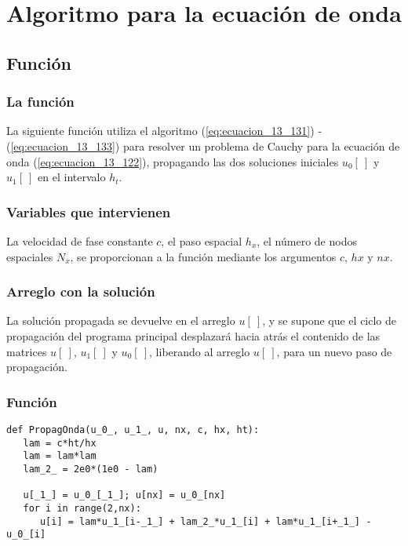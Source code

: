\section{Algoritmo para la ecuación de onda}
\subsection{Función \protect{}}
\begin{frame}
\frametitle{La función }
La siguiente función  utiliza el algoritmo (\ref{eq:ecuacion_13_131}) - (\ref{eq:ecuacion_13_133}) para resolver un problema de Cauchy para la ecuación de onda (\ref{eq:ecuacion_13_122}), propagando las dos soluciones iniciales $u_{0}[ \ ]$ y $u_{1}[ \ ]$ en el intervalo $h_{t}.$
\end{frame}
\begin{frame}
\frametitle{Variables que intervienen}
La velocidad de fase constante $c$, el paso espacial $h_{x}$, el número de nodos espaciales $N_{x}$, se proporcionan a la función mediante los argumentos $c$, $hx$ y $nx$.
\end{frame}
\begin{frame}
\frametitle{Arreglo con la solución}
La solución propagada se devuelve en el arreglo $u[ \ ]$, y se supone que el ciclo de propagación del programa principal desplazará hacia atrás el contenido de las matrices $u [ \ ]$, $u_{1} [ \ ]$ y $u_{0} [ \ ]$, liberando al arreglo $u [ \ ]$, para un nuevo paso de propagación.
\end{frame}
\begin{frame}
\frametitle{Función }
\begin{lstlisting}[caption=Función \texttt{PropagOnda} para el ejercicio, style=FormattedNumber, basicstyle=\linespread{1.1}\ttfamily=\small, columns=fullflexible]
def PropagOnda(u_0_, u_1_, u, nx, c, hx, ht):
   lam = c*ht/hx
   lam = lam*lam
   lam_2_ = 2e0*(1e0 - lam)

   u[_1_] = u_0_[_1_]; u[nx] = u_0_[nx]
   for i in range(2,nx):
      u[i] = lam*u_1_[i-_1_] + lam_2_*u_1_[i] + lam*u_1_[i+_1_] - u_0_[i]
\end{lstlisting}
\end{frame}
